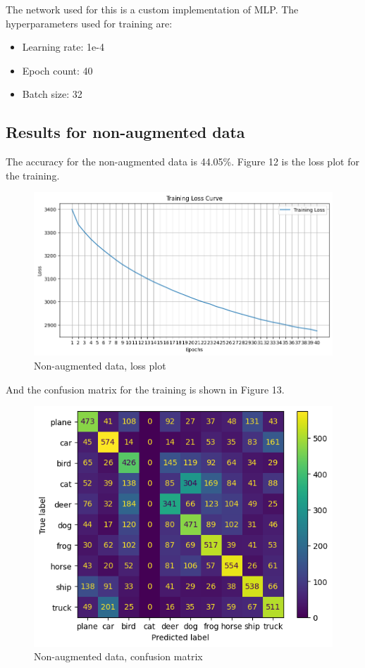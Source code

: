 \documentclass[conference]{IEEEtran}
\begin{document}
The network used for this is a custom implementation of MLP. The hyperparameters used for training are:
\begin{itemize}
  \item Learning rate: 1e-4
  \item Epoch count: 40
  \item Batch size: 32
\end{itemize}

\subsection{Results for non-augmented data}
The accuracy for the non-augmented data is 44.05\%. Figure 12 is the loss plot for the training.
\begin{figure}[!h]
  \centering
  \includegraphics[scale=0.4]{./images/output/loss1.png}
  \caption{Non-augmented data, loss plot}
\end{figure}

And the confusion matrix for the training is shown in Figure 13.
\begin{figure}[!h]
  \centering
  \includegraphics[scale=0.5]{./images/output/train1.png}
  \caption{Non-augmented data, confusion matrix}
\end{figure}
\end{document}
